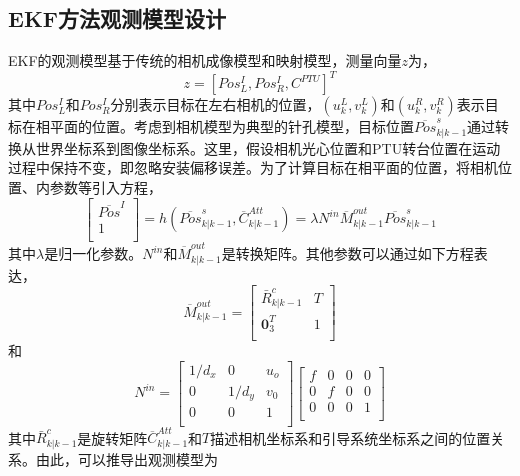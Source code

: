 \subsection{EKF方法观测模型设计}
EKF的观测模型基于传统的相机成像模型和映射模型，测量向量$z$为，
\begin{equation}
z=[Pos^I_L, Pos^I_R, C^{PTU}]^T
\end{equation} 
其中$Pos^I_L$和$Pos^I_R$分别表示目标在左右相机的位置，$(u^L_k, v^L_k)$和$(u^R_k, v^R_k)$表示目标在相平面的位置。考虑到相机模型为典型的针孔模型，目标位置$\overline{Pos}^s_{k|k-1}$通过转换从世界坐标系到图像坐标系。这里，假设相机光心位置和PTU转台位置在运动过程中保持不变，即忽略安装偏移误差。为了计算目标在相平面的位置，将相机位置、内参数等引入方程，
\begin{equation}
\left[\begin{matrix}
\overline{Pos}^I \\
1\\
\end{matrix}\right]
=h(\overline{Pos}^s_{k|k-1}, \overline{C}^{Att}_{k|k-1})
=\lambda N^{in}\overline{M}^{out}_{k|k-1}\overline{Pos}^s_{k|k-1}
\end{equation}
其中$\lambda$是归一化参数。$N^{in}$和$\overline{M}^{out}_{k|k-1}$是转换矩阵。其他参数可以通过如下方程表达，
\begin{equation}
\overline{M}^{out}_{k|k-1}
= \left[
\begin{matrix}
\bar{R}^c_{k|k-1} & T \\
\textbf{0}^T_3 & 1 \\
\end{matrix}
\right]
\end{equation}
和
\begin{equation}
N^{in}=
\left[
\begin{matrix}
1/d_x & 0 & u_o \\
0 & 1/d_y & v_0 \\
0 & 0 & 1 \\
\end{matrix}
\right]
\left[
\begin{matrix}
f & 0 & 0 & 0 \\
0 & f & 0 & 0 \\
0 & 0 & 0 & 1 \\
\end{matrix}
\right]
\end{equation}
其中$\bar{R}^c_{k|k-1}$是旋转矩阵$\overline{C}^{Att}_{k|k-1}$和$T$描述相机坐标系和引导系统坐标系之间的位置关系。由此，可以推导出观测模型为
